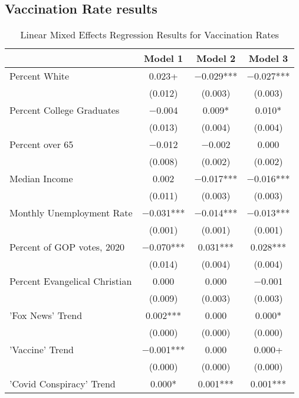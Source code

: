 \hypertarget{vaccination-rate-results}{%
\subsection{Vaccination Rate results}\label{vaccination-rate-results}}

\begin{table}[!h]

\caption{\label{tab:vacc-tab}Linear Mixed Effects Regression Results for Vaccination Rates}
\centering
\fontsize{8}{10}\selectfont
\begin{tabular}[t]{lccc}
\toprule
  & Model 1 & Model 2 & Model 3\\
\midrule
Percent White & \num{0.023}+ & \num{-0.029}*** & \num{-0.027}***\\
 & (\num{0.012}) & (\num{0.003}) & (\num{0.003})\\
Percent College Graduates & \num{-0.004} & \num{0.009}* & \num{0.010}*\\
 & (\num{0.013}) & (\num{0.004}) & (\num{0.004})\\
Percent over 65 & \num{-0.012} & \num{-0.002} & \num{0.000}\\
 & (\num{0.008}) & (\num{0.002}) & (\num{0.002})\\
Median Income & \num{0.002} & \num{-0.017}*** & \num{-0.016}***\\
 & (\num{0.011}) & (\num{0.003}) & (\num{0.003})\\
Monthly Unemployment Rate & \num{-0.031}*** & \num{-0.014}*** & \num{-0.013}***\\
 & (\num{0.001}) & (\num{0.001}) & (\num{0.001})\\
Percent of GOP votes, 2020 & \num{-0.070}*** & \num{0.031}*** & \num{0.028}***\\
 & (\num{0.014}) & (\num{0.004}) & (\num{0.004})\\
Percent Evangelical Christian & \num{0.000} & \num{0.000} & \num{-0.001}\\
 & (\num{0.009}) & (\num{0.003}) & (\num{0.003})\\
'Fox News' Trend & \num{0.002}*** & \num{0.000} & \num{0.000}*\\
 & (\num{0.000}) & (\num{0.000}) & \vphantom{4} (\num{0.000})\\
'Vaccine' Trend & \num{-0.001}*** & \num{0.000} & \num{0.000}+\\
 & (\num{0.000}) & (\num{0.000}) & \vphantom{3} (\num{0.000})\\
'Covid Conspiracy' Trend & \num{0.000}* & \num{0.001}*** & \num{0.001}***\\

\end{tabular}
\end{table}
